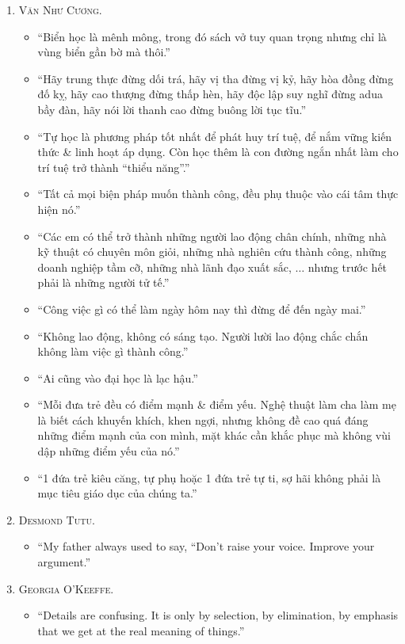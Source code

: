 \documentclass[oneside]{book}
\numberwithin{equation}{section}
\begin{document}
\begin{enumerate}
	\item \textsc{Văn Như Cương.}
	\begin{itemize}
		\item ``Biển học là mênh mông, trong đó sách vở tuy quan trọng nhưng chỉ là vùng biển gần bờ mà thôi.''
		\item ``Hãy trung thực đừng dối trá, hãy vị tha đừng vị kỷ, hãy hòa đồng đừng đố kỵ, hãy cao thượng đừng thấp hèn, hãy độc lập suy nghĩ đừng adua bầy đàn, hãy nói lời thanh cao đừng buông lời tục tĩu.''
		\item ``Tự học là phương pháp tốt nhất để phát huy trí tuệ, để nắm vững kiến thức \& linh hoạt áp dụng. Còn học thêm là con đường ngắn nhất làm cho trí tuệ trở thành ``thiểu năng''.''
		\item ``Tất cả mọi biện pháp muốn thành công, đều phụ thuộc vào cái tâm thực hiện nó.''
		\item ``Các em có thể trở thành những người lao động chân chính, những nhà kỹ thuật có chuyên môn giỏi, những nhà nghiên cứu thành công, những doanh nghiệp tầm cỡ, những nhà lãnh đạo xuất sắc, $\ldots$ nhưng trước hết phải là những người tử tế.''
		\item ``Công việc gì có thể làm ngày hôm nay thì đừng để đến ngày mai.''
		\item ``Không lao động, không có sáng tạo. Người lười lao động chắc chắn không làm việc gì thành công.''
		\item ``Ai cũng vào đại học là lạc hậu.''
		\item ``Mỗi đưa trẻ đều có điểm mạnh \& điểm yếu. Nghệ thuật làm cha làm mẹ là biết cách khuyến khích, khen ngợi, nhưng không đề cao quá đáng những điểm mạnh của con mình, mặt khác cần khắc phục mà không vùi dập những điểm yếu của nó.''
		\item ``1 đứa trẻ kiêu căng, tự phụ hoặc 1 đứa trẻ tự ti, sợ hãi không phải là mục tiêu giáo dục của chúng ta.''
	\end{itemize}
	\item \textsc{Desmond Tutu.}
	\begin{itemize}
		\item ``My father always used to say, ``Don't raise your voice. Improve your argument.''
	\end{itemize}
	\item \textsc{Georgia O'Keeffe.}
	\begin{itemize}
		\item ``Details are confusing. It is only by selection, by elimination, by emphasis that we get at the real meaning of things.''

\end{itemize}
\end{enumerate}
\end{document}
